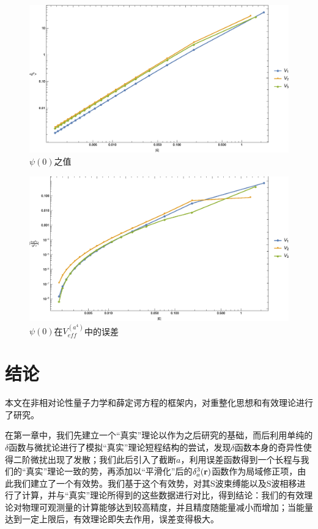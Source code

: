 \documentclass[cs4size,titlepage,twoside]{ctexart}
\begin{document}
\begin{figure}[!htbp]
	\centering
	\includegraphics[width=6in]{MultiplePotential_7.eps}
	\caption{$\psi(0)$之值}\label{MP7}
\end{figure}
\begin{figure}[H]
	\centering
	\includegraphics[width=6in]{MultiplePotential_8.eps}
	\caption{$\psi(0)$在$V_{eff}^{(a^4)}$中的误差}\label{MP8}
\end{figure}

\cleardoublepage

\section*{结论}

本文在非相对论性量子力学和薛定谔方程的框架内，对重整化思想和有效理论进行了研究。

在第一章中，我们先建立一个“真实”理论以作为之后研究的基础，而后利用单纯的$\delta$函数与微扰论进行了模拟“真实”理论短程结构的尝试，发现$\delta$函数本身的奇异性使得二阶微扰出现了发散；我们此后引入了截断$a$，利用误差函数得到一个长程与我们的“真实”理论一致的势，再添加以“平滑化”后的$\delta_a^3(\vb{r})$函数作为局域修正项，由此我们建立了一个有效势。我们基于这个有效势，对其S波束缚能以及S波相移进行了计算，并与“真实”理论所得到的这些数据进行对比，得到结论：我们的有效理论对物理可观测量的计算能够达到较高精度，并且精度随能量减小而增加；当能量达到一定上限后，有效理论即失去作用，误差变得极大。
\end{document}
